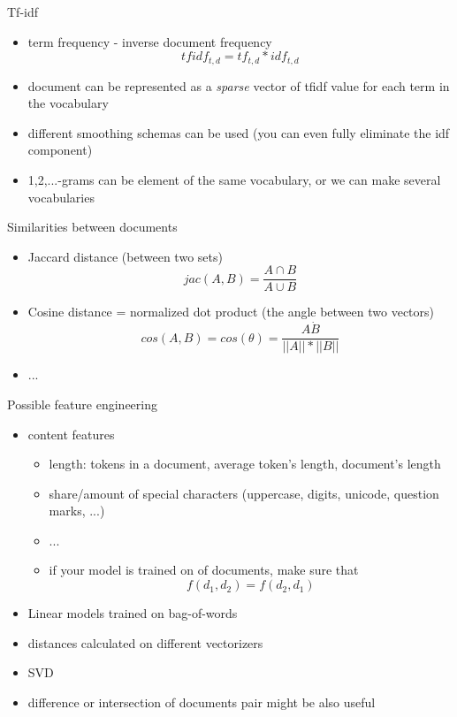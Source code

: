\documentclass{beamer}
\begin{document}
\begin{frame}{Tf-idf}
    \begin{itemize}
      \item 
        term frequency - inverse document frequency
        \[ tfidf_{t,d} = tf_{t,d} * idf_{t,d} \]
      \item
        document can be represented as a \textit{sparse} vector of tfidf value for each term in the vocabulary
      \item
        different smoothing schemas can be used (you can even fully eliminate the idf component)
      \item
        1,2,...-grams can be element of the same vocabulary, or we can make several vocabularies
    \end{itemize}
\end{frame}

\begin{frame}{Similarities between documents}
    \begin{itemize}
      \item 
        Jaccard distance (between two sets)
        \[jac(A,B) = \frac{A \cap B}{A \cup B}\]
      \item
        Cosine distance = normalized dot product (the angle between two vectors)
        \[ cos(A,B) = cos(\theta) = \frac{A \dot B}{||A|| * ||B||} \]
      \item
        ...
    \end{itemize}
\end{frame}

\begin{frame}{Possible feature engineering}
    \begin{itemize}
      \item 
        content features
        \begin{itemize}
            \item length: tokens in a document, average token's length, document's length
            \item share/amount of special characters (uppercase, digits, unicode, question marks, ...)
            \item ...
            \item if your model is trained on  of documents, make sure that
            \[f(d_1, d_2) = f(d_2, d_1)\]
        \end{itemize}
      \item
        Linear models trained on bag-of-words
      \item
        distances calculated on different vectorizers
      \item
        SVD
      \item
        difference or intersection of documents pair might be also useful
    \end{itemize}
\end{frame}
\end{document}
